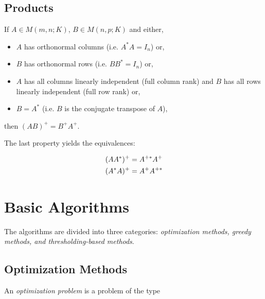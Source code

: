 \subsection{Products}

If $A \in M(m,n;K)$, $B \in M(n,p;K)$ and either, 
\begin{itemize}
    \item $A$ has orthonormal columns (i.e. $A^*A = I_n$) or, 
    \item $B$ has orthonormal rows (i.e. $BB^* = I_n$) or,
    \item $A$ has all columns linearly independent (full column rank) and $B$ has all rows linearly independent (full row rank) or,
    \item $B = A^*$ (i.e. $B$ is the conjugate transpose of $A$),
\end{itemize}
then $(AB)^+ = B^+A^+$.

The last property yields the equivalences:

\begin{eqnarray}
    \begin{gathered}
        (AA^*)^+ = A^{+*}A^+  \notag\\
        (A^*A)^+ = A^+ A^{+*}
    \end{gathered}
    \label{eq0.2.6}
\end{eqnarray}

\section{Basic Algorithms}

The algorithms are divided into three categories: \emph{\textcolor[rgb]{1,0,0}{optimization methods, greedy methods, and thresholding-based methods}}. 

\subsection{Optimization Methods}

An \emph{\textcolor[rgb]{1,0,0}{optimization problem}} is a problem of the type

